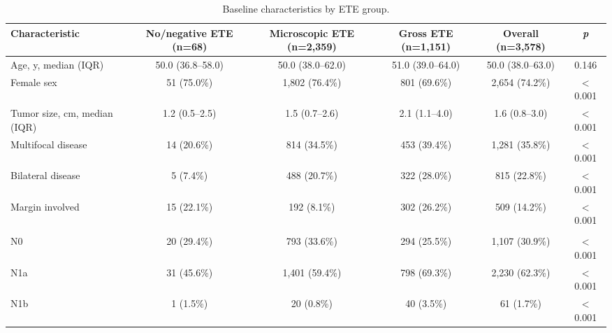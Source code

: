 

\begin{landscape}
\begin{table}[htbp]
\centering
\scriptsize
\caption{Baseline characteristics by ETE group.}
\label{tab:baseline}
\begin{threeparttable}
\begin{tabular}{@{}lccccc@{}}
\toprule
\textbf{Characteristic} & \textbf{No/negative ETE (n=68)} & \textbf{Microscopic ETE (n=2{,}359)} & \textbf{Gross ETE (n=1{,}151)} & \textbf{Overall (n=3{,}578)} & \textbf{\textit{p}} \\
\midrule
Age, y, median (IQR) & 50.0 (36.8--58.0) & 50.0 (38.0--62.0) & 51.0 (39.0--64.0) & 50.0 (38.0--63.0) & 0.146 \\
Female sex & 51 (75.0\%) & 1{,}802 (76.4\%) & 801 (69.6\%) & 2{,}654 (74.2\%) & $<$0.001 \\
Tumor size, cm, median (IQR) & 1.2 (0.5--2.5) & 1.5 (0.7--2.6) & 2.1 (1.1--4.0) & 1.6 (0.8--3.0) & $<$0.001 \\
Multifocal disease & 14 (20.6\%) & 814 (34.5\%) & 453 (39.4\%) & 1{,}281 (35.8\%) & $<$0.001 \\
Bilateral disease & 5 (7.4\%) & 488 (20.7\%) & 322 (28.0\%) & 815 (22.8\%) & $<$0.001 \\
Margin involved & 15 (22.1\%) & 192 (8.1\%) & 302 (26.2\%) & 509 (14.2\%) & $<$0.001 \\
\addlinespace
\multicolumn{6}{l}{\textit{AJCC 8th edition N stage}} \\
\quad N0 & 20 (29.4\%) & 793 (33.6\%) & 294 (25.5\%) & 1{,}107 (30.9\%) & $<$0.001 \\
\quad N1a & 31 (45.6\%) & 1{,}401 (59.4\%) & 798 (69.3\%) & 2{,}230 (62.3\%) & $<$0.001 \\
\quad N1b & 1 (1.5\%) & 20 (0.8\%) & 40 (3.5\%) & 61 (1.7\%) & $<$0.001 \\

\end{tabular}
\end{threeparttable}
\end{table}
\end{landscape}

